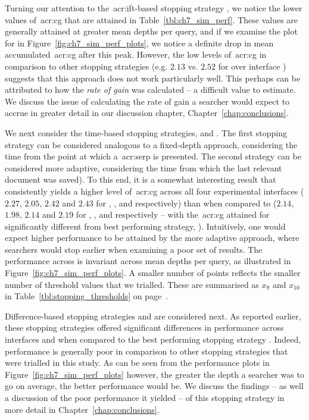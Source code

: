 Turning our attention to the~\gls{acr:ift}-based stopping strategy , we notice the lower values of~\gls{acr:cg} that are attained in Table~\ref{tbl:ch7_sim_perf}. These values are generally attained at greater mean depths per query, and if we examine the plot for  in Figure~\ref{fig:ch7_sim_perf_plots}, we notice a definite drop in mean accumulated~\gls{acr:cg} after this peak. However, the low levels of~\gls{acr:cg} in comparison to other stopping strategies (e.g. $2.13$ vs. $2.52$ for  over interface ) suggests that this approach does not work particularly well. This perhaps can be attributed to how the \emph{rate of gain} was calculated -- a difficult value to estimate. We discuss the issue of calculating the rate of gain a searcher would expect to accrue in greater detail  in our discussion chapter, Chapter~\ref{chap:conclusions}.

We next consider the time-based stopping strategies,  and . The first stopping strategy can be considered analogous to a fixed-depth approach, considering the time from the point at which a~\gls{acr:serp} is presented. The second strategy can be considered more adaptive, considering the time from which the last relevant document was saved). To this end, it is a somewhat interesting result that  consistently yields a higher level of~\gls{acr:cg} across all four experimental interfaces ($2.27$, $2.05$, $2.42$ and $2.43$ for , ,  and  respectively) than when compared to  ($2.14$, $1.98$, $2.14$ and $2.19$ for , ,  and  respectively -- with the~\gls{acr:cg} attained for  significantly different from best performing strategy, ). Intuitively, one would expect higher performance to be attained by the more adaptive approach, where searchers would stop earlier when examining a poor set of results. The performance across  is invariant across mean depths per query, as illustrated in Figure~\ref{fig:ch7_sim_perf_plots}. A smaller number of points reflects the smaller number of threshold values that we trialled. These are summarised as $x_9$ and $x_{10}$ in Table~\ref{tbl:stopping_thresholds} on page~\pageref{tbl:stopping_thresholds}.

Difference-based stopping strategies  and  are considered next. As reported earlier, these stopping strategies offered significant differences in performance across interfaces  and  when compared to the best performing stopping strategy . Indeed, performance is generally poor in comparison to other stopping strategies that were trialled in this study. As can be seen from the performance plots in Figure~\ref{fig:ch7_sim_perf_plots} however, the greater the depth a searcher was to go on average, the better performance would be. We discuss the findings -- as well a discussion of the poor performance it yielded -- of this stopping strategy in more detail in Chapter~\ref{chap:conclusions}.


